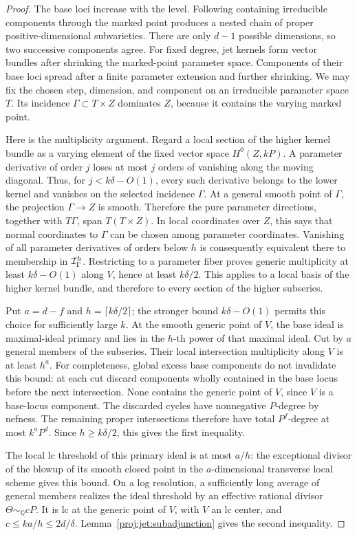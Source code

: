 \documentclass[11pt,letterpaper]{article}
\newcommand{\Q}{\mathbb{Q}}
\theoremstyle{definition}
\theoremstyle{remark}
\begin{document}
\begin{proof}
The base loci increase with the level.  Following containing
irreducible components through the marked point produces a nested
chain of proper positive-dimensional subvarieties.  There are only
\(d-1\) possible dimensions, so two successive components agree.
For fixed degree, jet kernels form vector bundles after shrinking
the marked-point parameter space.  Components of their base loci
spread after a finite parameter extension and further shrinking.
We may fix the chosen step, dimension, and component on an
irreducible parameter space \(T\).  Its incidence
\(\Gamma\subset T\times Z\) dominates \(Z\), because it contains the
varying marked point.

Here is the multiplicity argument.  Regard a local section of the
higher kernel bundle as a varying element of the fixed vector space
\(H^0(Z,kP)\).  A parameter derivative of order \(j\) loses at most
\(j\) orders of vanishing along the moving diagonal.  Thus, for
\(j<k\delta-O(1)\), every such derivative belongs to the lower kernel
and vanishes on the selected incidence \(\Gamma\).
At a general smooth point of \(\Gamma\), the projection
\(\Gamma\to Z\) is smooth.  Therefore the pure parameter directions,
together with \(T\Gamma\), span \(T(T\times Z)\).
In local coordinates over \(Z\), this says that normal coordinates
to \(\Gamma\) can be chosen among parameter coordinates.  Vanishing
of all parameter derivatives of orders below \(h\) is consequently
equivalent there to membership in \({\cal I}_\Gamma^h\).
Restricting to a parameter fiber proves generic multiplicity at
least \(k\delta-O(1)\) along \(V\), hence at least \(k\delta/2\).
This applies to a local basis of the higher kernel bundle, and
therefore to every section of the higher subseries.

Put \(a=d-f\) and \(h=\lceil k\delta/2\rceil\); the stronger bound
\(k\delta-O(1)\) permits this choice for sufficiently large \(k\).
At the smooth generic point of
\(V\), the base ideal is maximal-ideal primary and lies in the
\(h\)-th power of that maximal ideal.  Cut by \(a\) general members
of the subseries.  Their local intersection multiplicity along
\(V\) is at least \(h^a\).  For completeness, global excess base
components do not invalidate this bound: at each cut discard
components wholly contained in the base locus before the next
intersection.  None contains the generic point of \(V\), since
\(V\) is a base-locus component.  The discarded cycles have
nonnegative \(P\)-degree by nefness.  The remaining proper
intersections therefore have total \(P^f\)-degree at most
\(k^aP^d\).  Since \(h\ge k\delta/2\), this gives the first inequality.

The local lc threshold of this primary ideal is at most \(a/h\):
the exceptional divisor of the blowup of its smooth closed point
in the \(a\)-dimensional transverse local scheme gives this bound.
On a log resolution, a sufficiently long average of general
members realizes the ideal threshold by an effective rational
divisor \(\Theta\sim_{\Q}cP\).  It is lc at the generic point of
\(V\), with \(V\) an lc center, and
\(c\le k a/h\le2d/\delta\).
Lemma~\ref{proj:jet:subadjunction} gives the second inequality.
\end{proof}
\end{document}

